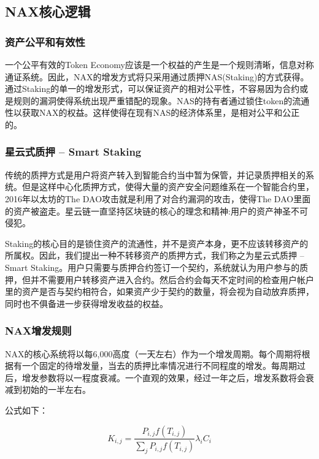 \subsection{NAX核心逻辑}

\subsubsection{资产公平和有效性}

一个公平有效的Token Economy应该是一个权益的产生是一个规则清晰，信息对称通证系统。因此，NAX的增发方式将只采用通过质押NAS(Staking)的方式获得。通过Staking的单一的增发形式，可以保证资产的相对公平性，不容易因为合约或是规则的漏洞使得系统出现严重错配的现象。NAS的持有者通过锁住token的流通性以获取NAX的权益。这样使得在现有NAS的经济体系里，是相对公平和公正的。

\subsubsection{星云式质押 -- Smart Staking}
传统的质押方式是用户将资产转入到智能合约当中暂为保管，并记录质押相关的系统。但是这样中心化质押方式，使得大量的资产安全问题维系在一个智能合约里，2016年以太坊的The DAO攻击就是利用了对合约漏洞的攻击，使得The DAO里面的资产被盗走。星云链一直坚持区块链的核心的理念和精神:用户的资产神圣不可侵犯。

Staking的核心目的是锁住资产的流通性，并不是资产本身，更不应该转移资产的所属权。因此，我们提出一种不转移资产的质押方式，我们称之为星云式质押 -- Smart Staking。用户只需要与质押合约签订一个契约，系统就认为用户参与的质押，但并不需要用户转移资产进入合约。然后合约会每天不定时间的检查用户帐户里的资产是否与契约相符合，如果资产少于契约的数量，将会视为自动放弃质押，同时也不俱备进一步获得增发收益的权益。

\subsubsection{NAX增发规则}
NAX的核心系统将以每6,000高度（一天左右）作为一个增发周期。每个周期将根据有一个固定的待增发量，当去的质押比率情况进行不同程度的增发。每周期过后，增发参数将以一程度衰减。一个直观的效果，经过一年之后，增发系数将会衰减到初始的一半左右。

公式如下：

\begin{equation}
  K_{i,j} = \frac{P_{i,j} f(T_{i,j})}{\sum_j P_{i,j} f(T_{i,j})} \lambda_i C_i
\end{equation}

